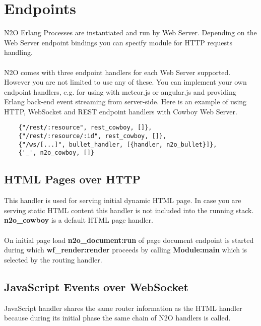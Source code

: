 \section{Endpoints}
N2O Erlang Processes are instantiated and run by Web Server.
Depending on the Web Server endpoint bindings you can specify
module for HTTP requests handling.

\paragraph{}
N2O comes with three endpoint handlers for each Web Server supported.
However you are not limited to use any of these.
You can implement your own endpoint handlers, e.g. for using with
meteor.js or angular.js and providing Erlang back-end event streaming
from server-side. Here is an example of using HTTP, WebSocket and
REST endpoint handlers with Cowboy Web Server.

\vspace{1\baselineskip}
\begin{lstlisting}
    {"/rest/:resource", rest_cowboy, []},
    {"/rest/:resource/:id", rest_cowboy, []},
    {"/ws/[...]", bullet_handler, [{handler, n2o_bullet}]},
    {'_', n2o_cowboy, []}
\end{lstlisting}

\subsection{HTML Pages over HTTP}
This handler is used for serving initial dynamic HTML page.
In case you are serving static HTML content this handler is
not included into the running stack. {\bf {n2o}\_{cowboy}} is
a default HTML page handler.

\paragraph{}
On initial page load {\bf {n2o}\_{document}:run} of page document endpoint is started during
which {\bf {wf}\_{render}:render} proceeds by calling {\bf Module:main} which
is selected by the routing handler.

\subsection{JavaScript Events over WebSocket}
JavaScript handler shares the same router information as the
HTML handler because during its initial phase the same chain
of N2O handlers is called.

